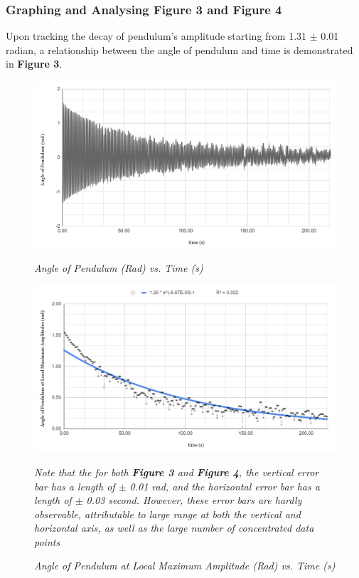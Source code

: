 \documentclass{article}
\begin{document}
\subsubsection{Graphing and Analysing Figure 3 and Figure 4}

Upon tracking the decay of pendulum's amplitude starting from 1.31 $\pm$ 0.01 radian, a relationship between the angle of pendulum and time is demonstrated in \textbf{Figure 3}. 

\begin{figure}[h]
\begin{minipage}{.5\textwidth}
	\centering
	\includegraphics[scale=0.4]{Pendulum_Decay_Chart1.png}
	\caption{\textit{Angle of Pendulum (Rad) vs. Time (s)}}
	\label{fig_angle}
\end{minipage}%
\begin{minipage}{.5\textwidth}
	\centering
	\includegraphics[scale=0.5]{Pendulum_Decay_Chart2.png}
	
	\caption{\textit{Angle of Pendulum at Local Maximum Amplitude (Rad) vs. Time (s)}}
\end{minipage}

	\center \textit{Note that the for both \textbf{Figure 3} and \textbf{Figure 4}, the vertical error bar has a length of $\pm$ 0.01 rad, and the horizontal error bar has a length of $\pm$ 0.03 second. However, these error bars are hardly observable, attributable to large range at both the vertical and horizontal axis, as well as the large number of concentrated data points}
	\label{fig_angle}
\end{figure}
\end{document}
